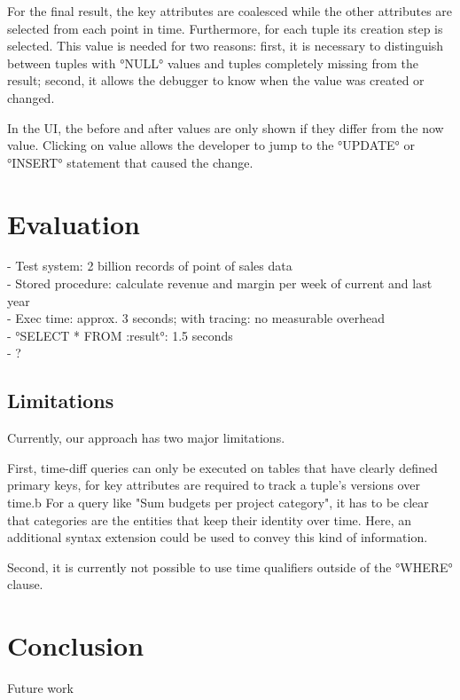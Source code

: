 \documentclass[english]{sig-alternate-05-2015}
\newcommand{\todo}[2][]{\pdfmargincomment[author={#1}]{#2}}
\begin{document}
For the final result, the key attributes are coalesced while the other attributes are selected from each point in time.
Furthermore, for each tuple its creation step is selected.
This value is needed for two reasons: first, it is necessary to distinguish between tuples with °NULL° values and tuples completely missing from the result; second, it allows the debugger to know when the value was created or changed.

In the UI, the before and after values are only shown if they differ from the now value.
Clicking on value allows the developer to jump to the °UPDATE° or °INSERT° statement that caused the change.


\section{Evaluation}
\label{sec:evaluation}

- Test system: 2 billion records of point of sales data \\
- Stored procedure: calculate revenue and margin per week of current and last year \\
- Exec time: approx. 3 seconds; with tracing: no measurable overhead \\
- °SELECT * FROM :result°: 1.5 seconds \\
- \todo{time-diff queries}?


\subsection{Limitations}

Currently, our approach has two major limitations.

First, time-diff queries can only be executed on tables that have clearly defined primary keys, for key attributes are required to track a tuple's versions over time.b
For a query like "Sum budgets per project category", it has to be clear that categories are the entities that keep their identity over time.
Here, an additional syntax extension could be used to convey this kind of information.

Second, it is currently not possible to use time qualifiers outside of the °WHERE° clause.


\section{Conclusion}
\label{sec:conclusion}


Future work

%

\end{document}
